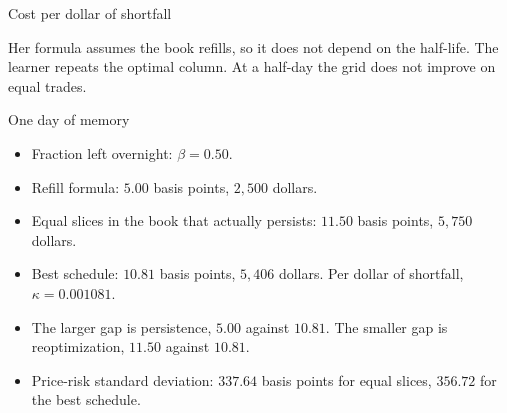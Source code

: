 \documentclass[aspectratio=169,10pt]{beamer}
\newcommand{\currentsource}{}
\newcommand{\framesource}[1]{\gdef\currentsource{#1}}
\newcommand{\aiassisted}{AI assisted, via Grok 4.7}
\begin{document}
\newsavebox{\sizetable}

\begin{frame}{Cost per dollar of shortfall}
\framesource{\aiassisted}
\usebox{\kappatable}

\vspace{0.7em}
Her formula assumes the book refills, so it does not depend on the half-life. The learner repeats the optimal column. At a half-day the grid does not improve on equal trades.
\end{frame}

\begin{frame}{One day of memory}
\framesource{\aiassisted}
\begin{itemize}
\item Fraction left overnight: \(\beta=0.50\).
\item Refill formula: \(5.00\) basis points, \(2{,}500\) dollars.
\item Equal slices in the book that actually persists: \(11.50\) basis points, \(5{,}750\) dollars.
\item Best schedule: \(10.81\) basis points, \(5{,}406\) dollars. Per dollar of shortfall, \(\kappa=0.001081\).
\item The larger gap is persistence, \(5.00\) against \(10.81\). The smaller gap is reoptimization, \(11.50\) against \(10.81\).
\item Price-risk standard deviation: \(337.64\) basis points for equal slices, \(356.72\) for the best schedule.
\end{itemize}
\end{frame}
\end{document}
